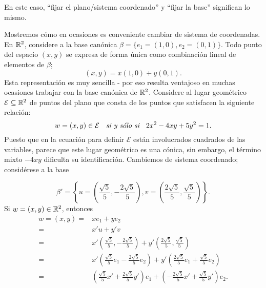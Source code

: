 En este caso, ``fijar el plano/sistema coordenado'' y
``fijar la base'' significan lo mismo.
\begin{ejem}
Mostremos cómo en ocasiones es conveniente cambiar de sistema de coordenadas.
En $\mathbb{R}^{2}$, considere a la base canónica $\beta = \{ 
e_{1} = (1, 0), e_{2} = (0, 1) \}$.
Todo punto del espacio $(x, y)$ se expresa de forma única como combinación
lineal de elementos de $\beta$;
\[
(x, y) = x(1, 0) + y(0,1).
\]
Esta representación es muy sencilla - por eso resulta ventajoso en muchas
ocasiones trabajar con la base canónica de $\mathbb{R}^{2}$. Considere al lugar 
geométrico $\mathcal{E} \subseteq \mathbb{R}^{2}$ de puntos del plano que 
consta de los puntos que satisfacen la siguiente relación:
\begin{equation}
	\label{eq: elipse 1}
	w = (x, y) \in \mathcal{E} \hspace{0.2cm} \textit{ si y sólo si }
	\hspace{0.2cm}
	2x^{2} - 4xy + 5 y^{2} = 1.
\end{equation}
Puesto que en la ecuación para definir $\mathcal{E}$ están
involucrados cuadrados de las variables, parece que este lugar
geométrico es una cónica, sin embargo,
el término mixto $-4xy$ dificulta su identificación. Cambiemos 
de sistema coordenado; considérese a la base

\[
\beta' = \left\{
u = \left( \frac{\sqrt{5}}{5}, -\frac{2 \sqrt{5}}{5} \right),
v = \left( \frac{2\sqrt{5}}{5}, \frac{\sqrt{5}}{5} \right)
\right\}.
\]
Si $w = (x, y) \in \mathbb{R}^{2}$, entonces
\begin{align*}
w = (x, y) = & x e_{1} + y e_{2} \\
= & x'u + y' v \\
= &  x' \left( \frac{\sqrt{5}}{5}, -\frac{2 \sqrt{5}}{5} \right) 
+ y' \left( \frac{2\sqrt{5}}{5}, \frac{\sqrt{5}}{5} \right) \\
= &x' \left( \frac{\sqrt{5}}{5} e_{1} -
\frac{2\sqrt{5}}{5} e_{2} \right)
+ y' \left( \frac{2\sqrt{5}}{5}e_{1} + 
\frac{\sqrt{5}}{5} e_{2} \right) \\
= & \left( \frac{\sqrt{5}}{5} x' + \frac{2\sqrt{5}}{5} y' \right)e_{1} + 
\left( -\frac{2\sqrt{5}}{5} x' + \frac{\sqrt{5}}{5}y' \right) e_{2}.
\end{align*}



\end{ejem}
